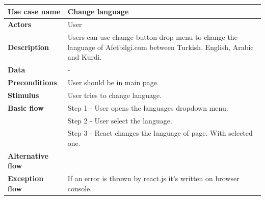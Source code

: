 \begin{center}
    \begin{table}[H]
        \begin{tabular}{| m{3cm}| m{10cm} |}
            \hline
            \textbf{Use case name}    & Change language                                                                                                           \\
            \hline
            \textbf{Actors}           & User                                                                                                                      \\
            \hline
            \textbf{Description}      & Users can use change button drop menu to change the language of Afetbilgi.com between Turkish, English, Arabic and Kurdi. \\
            \hline
            \textbf{Data}             & -                                                                                                                         \\
            \hline
            \textbf{Preconditions}    & User should be in main page.                                                                                              \\
            \hline
            \textbf{Stimulus}         & User tries to change language.                                                                                            \\
            \hline
            \textbf{Basic flow}       & Step 1 - User opens the languages dropdown menu.                                                                          \\
                                      & Step 2 - User select the language.                                                                                        \\
                                      & Step 3 - React changes the language of page. With selected one.                                                           \\
            \hline
            \textbf{Alternative flow} & -                                                                                                                         \\
            \hline
            \textbf{Exception flow}   & If an error is thrown by react.js it's written on browser console.                                                        \\

\end{tabular}
\end{table}
\end{center}
